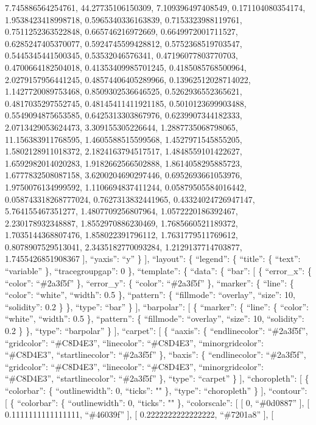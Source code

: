 \documentclass[
]{article}
\begin{document}
7.745886564254761, 44.27735106150309, 7.109396497408549,
0.171104080354174, 1.9538423418998718, 0.5965340336163839,
0.7153323988119761, 0.7511252363522848, 0.665746216972669,
0.6649972001711527, 0.6285247405370077, 0.5924745599428812,
0.5752368519703547, 0.5445345441500345, 0.53532046576341,
0.47196077803770703, 0.4700664182504018, 0.41353409985701245,
0.4185085768500964, 2.0279157956441245, 0.48574406405289966,
0.13962512028714022, 1.1427720089753468, 0.8509302536646525,
0.5262936552365621, 0.4817035297552745, 0.48145411411921185,
0.5010123699903488, 0.5549094875653585, 0.6425313303867976,
0.6239907344182333, 2.0713429053624473, 3.309155305226644,
1.2887735068798065, 11.156383911768595, 1.4605588515599568,
1.4527971545855205, 1.5802128911018372, 2.1824163794517517,
1.4848559101422627, 1.6592982014020283, 1.9182662566502888,
1.8614058295885723, 1.6777832508087158, 3.6200204690297446,
0.6952693661053976, 1.9750076134999592, 1.1106694837411244,
0.05879505584016442, 0.058743318268777024, 0.7627313832441965,
0.43324024726947147, 5.764155467351277, 1.4807709256807964,
1.0572220186392467, 2.230178932348887, 1.8552970886230469,
1.7685660521189372, 1.7035144368807476, 1.858022391796112,
1.7631779511769612, 0.8078907529513041, 2.3435182770093284,
1.2129137714703877, 1.7455426851908367 {]}, ``yaxis'': ``y'' \} {]},
``layout'': \{ ``legend'': \{ ``title'': \{ ``text'': ``variable'' \},
``tracegroupgap'': 0 \}, ``template'': \{ ``data'': \{ ``bar'': {[} \{
``error\_x'': \{ ``color'': ``\#2a3f5f'' \}, ``error\_y'': \{ ``color'':
``\#2a3f5f'' \}, ``marker'': \{ ``line'': \{ ``color'': ``white'',
``width'': 0.5 \}, ``pattern'': \{ ``fillmode'': ``overlay'', ``size'':
10, ``solidity'': 0.2 \} \}, ``type'': ``bar'' \} {]}, ``barpolar'': {[}
\{ ``marker'': \{ ``line'': \{ ``color'': ``white'', ``width'': 0.5 \},
``pattern'': \{ ``fillmode'': ``overlay'', ``size'': 10, ``solidity'':
0.2 \} \}, ``type'': ``barpolar'' \} {]}, ``carpet'': {[} \{ ``aaxis'':
\{ ``endlinecolor'': ``\#2a3f5f'', ``gridcolor'': ``\#C8D4E3'',
``linecolor'': ``\#C8D4E3'', ``minorgridcolor'': ``\#C8D4E3'',
``startlinecolor'': ``\#2a3f5f'' \}, ``baxis'': \{ ``endlinecolor'':
``\#2a3f5f'', ``gridcolor'': ``\#C8D4E3'', ``linecolor'': ``\#C8D4E3'',
``minorgridcolor'': ``\#C8D4E3'', ``startlinecolor'': ``\#2a3f5f'' \},
``type'': ``carpet'' \} {]}, ``choropleth'': {[} \{ ``colorbar'': \{
``outlinewidth'': 0, ``ticks'': "" \}, ``type'': ``choropleth'' \} {]},
``contour'': {[} \{ ``colorbar'': \{ ``outlinewidth'': 0, ``ticks'': ""
\}, ``colorscale'': {[} {[} 0, ``\#0d0887'' {]}, {[} 0.1111111111111111,
``\#46039f'' {]}, {[} 0.2222222222222222, ``\#7201a8'' {]}, {[}
\end{document}
